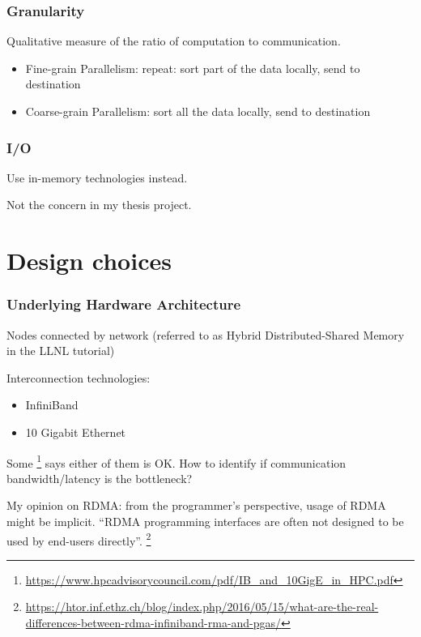 \documentclass{beamer}
\begin{document}
\begin{frame}
\frametitle{Granularity}

Qualitative measure of the ratio of computation to communication.

\begin{itemize}
  \item Fine-grain Parallelism: repeat: sort part of the data locally, send to destination
  \item Coarse-grain Parallelism: sort all the data locally, send to destination
\end{itemize}
    
\end{frame}

\begin{frame}
\frametitle{I/O}

Use in-memory technologies instead.

Not the concern in my thesis project.
    
\end{frame}


\section{Design choices}


\begin{frame}
\frametitle{Underlying Hardware Architecture}

Nodes connected by network (referred to as Hybrid Distributed-Shared Memory in the LLNL tutorial)

Interconnection technologies:
\begin{itemize}
  \item InfiniBand
  \item 10 Gigabit Ethernet
\end{itemize}

Some \footnote{\url{https://www.hpcadvisorycouncil.com/pdf/IB\_and\_10GigE\_in\_HPC.pdf}}
says either of them is OK.
How to identify if communication bandwidth/latency is the bottleneck?

My opinion on RDMA:
from the programmer’s perspective, usage of RDMA might be implicit.
“RDMA programming interfaces are often not designed to be used by end-users directly”.
\footnote{\url{https://htor.inf.ethz.ch/blog/index.php/2016/05/15/what-are-the-real-differences-between-rdma-infiniband-rma-and-pgas/}}

\end{frame}
\end{document}

